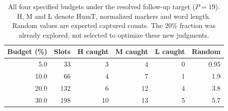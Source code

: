 \begin{table}[htbp]
\centering\small
\caption{All four specified budgets under the resolved follow-up target ($P=19$). H, M and L denote HumT, normalized markers and word length. Random values are expected captured counts. The 20\% fraction was already explored, not selected to optimize these new judgments.}
\label{tab:annotation_budgets}
\begin{tabular}{rrrrrr}
\toprule
Budget (\%) & Slots & H caught & M caught & L caught & Random \\
\midrule
5.0 & 33 & 3 & 4 & 0 & 0.95 \\
10.0 & 66 & 4 & 7 & 1 & 1.9 \\
20.0 & 132 & 6 & 12 & 4 & 3.8 \\
30.0 & 198 & 10 & 13 & 5 & 5.7 \\
\bottomrule
\end{tabular}
\end{table}
